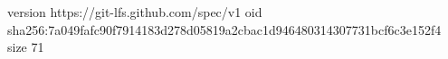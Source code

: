 version https://git-lfs.github.com/spec/v1
oid sha256:7a049fafc90f7914183d278d05819a2cbac1d946480314307731bcf6c3e152f4
size 71
